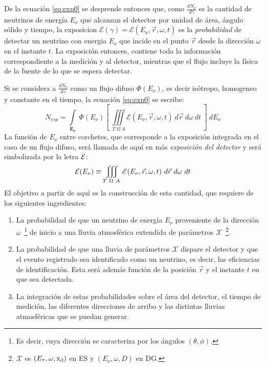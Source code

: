 	De la ecuación \ref{eq:exp0} se desprende entonces que, como $\frac{dN_{\nu}}{d\gamma}$ es la cantidad de neutrinos de energía $E_{\nu}$ que alcanzan el detector por unidad de área, ángulo sólido y tiempo, la exposicion $\mathscr{E}(\gamma)=\mathscr{E}(E_{\nu},\vec{r},\omega,t)$ es la \emph{probabilidad} de detectar un neutrino con energia $E_\nu$ que incide en el punto $\vec{r}$ desde la direcci\'on $\omega$ en el instante $t$.
	La exposición entonces, contiene toda la información correspondiente a la medición y al detector, mientras que el flujo incluye la física de la fuente de lo que se espera detectar.
	
	Si se considera a $\frac{dN_{\nu}}{d\gamma}$ como un flujo difuso $\Phi(E_{\nu})$, es decir isótropo, homogeneo y constante en el tiempo, la ecuación \ref{eq:exp0} se escribe:
	\begin{equation}
	 N_{esp}=\int\limits_{\mathbf{E_{\nu}}}~\Phi(E_{\nu})\left[~\iiint\limits_{T~\Omega~A}\mathscr{E}(E_{\nu},\vec{r},\omega,t) ~d\vec{r}~d\omega~dt~\right]~dE_\nu
	 \label{eq:exp1}
	\end{equation}
	La función de $E_\nu$ entre corchetes, que corresponde a la exposición integrada en el caso de un flujo difuso, será llamada de aquí en más \emph{exposición del detector} y será simbolizada por la letra $\cal E$:
	\begin{equation}
	 {\cal E}(E_\nu)\equiv\iiint\limits_{T~\Omega~A}\mathscr{E}(E_{\nu},\vec{r},\omega,t) ~d\vec{r}~d\omega~dt
	 \label{eq:exp2}
	\end{equation}
	El objetivo a partir de aquí es la construcción de esta cantidad, que requiere de los siguientes ingredientes:
	\begin{enumerate}
	 \item La probabilidad de que un neutrino de energía $E_\nu$ proveniente de la direcci\'on  $\omega$~\footnote{Es decir, cuya dirección se caracteriza por los ángulos $(\theta,\phi)$.} de inicio a una lluvia atmosférica extendida de parámetros $\mathcal{X}$~\footnote{$\mathcal{X}$ es $(E_\tau,\omega,{\rm x_d})$ en ES y $(E_\nu,\omega,D)$ en DG.}.
	 \item La probabilidad de que una lluvia de parámetros $\mathcal{X}$ dispare el detector y que el evento registrado sea identificado como un neutrino, es decir, las eficiencias de identificación. Esta ser\'a adem\'as funci\'on de la posici\'on $\vec{r}$ y el instante $t$ en que sea detectada.
	 \item La integración de estas probabilidades sobre el área del detector, el tiempo de medición, las diferentes direcciones de arribo y las distintas lluvias atmosféricas que se puedan generar.
	\end{enumerate}
	
